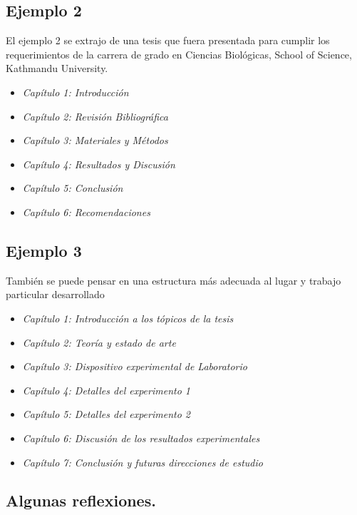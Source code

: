 \subsection{Ejemplo 2}
El ejemplo 2 se extrajo de una tesis que fuera presentada para cumplir los requerimientos de la carrera de grado en Ciencias Biológicas, School of Science, Kathmandu University.

\begin{itemize}
	\item \textit{Capítulo 1: Introducción}
	\item \textit{Capítulo 2: Revisión Bibliográfica}
	\item \textit{Capítulo 3: Materiales y Métodos}
	\item \textit{Capítulo 4: Resultados y Discusión}
	\item \textit{Capítulo 5: Conclusión}
	\item \textit{Capítulo 6: Recomendaciones}
\end{itemize}
\subsection{Ejemplo 3}
También se puede pensar en una estructura más adecuada al lugar y trabajo particular desarrollado

\begin{itemize}
	\item \textit{Capítulo 1: Introducción a los tópicos de la tesis}
	\item \textit{Capítulo 2: Teoría y estado de arte}
	\item \textit{Capítulo 3: Dispositivo experimental de Laboratorio}
	\item \textit{Capítulo 4: Detalles del experimento 1}
	\item \textit{Capítulo 5: Detalles del experimento 2}
	\item \textit{Capítulo 6: Discusión de los resultados experimentales}
	\item \textit{Capítulo 7: Conclusión y futuras direcciones de estudio}
	
\end{itemize}	


\subsection{Algunas reflexiones. }

